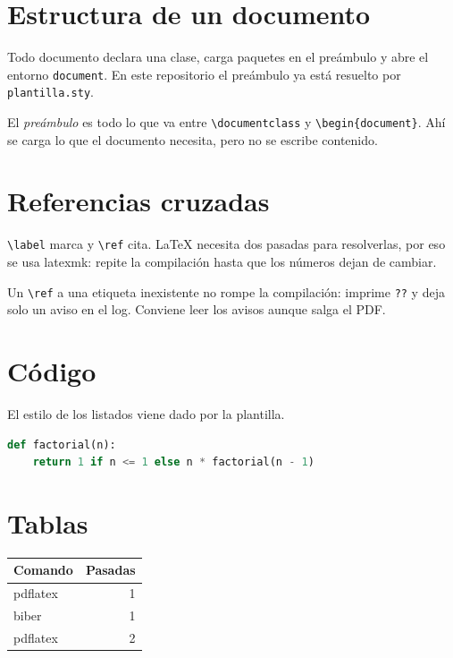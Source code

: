 \documentclass[a4paper,11pt]{article}
\begin{document}
\portada
\indice

\section{Estructura de un documento}

Todo documento declara una clase, carga paquetes en el preámbulo y abre el
entorno \texttt{document}. En este repositorio el preámbulo ya está resuelto por
\texttt{plantilla.sty}.

\begin{nota}[Definición]
    El \emph{preámbulo} es todo lo que va entre
    \texttt{\textbackslash documentclass} y
    \texttt{\textbackslash begin\{document\}}. Ahí se carga lo que el documento
    necesita, pero no se escribe contenido.
\end{nota}

\section{Referencias cruzadas}

\texttt{\textbackslash label} marca y \texttt{\textbackslash ref} cita. LaTeX
necesita dos pasadas para resolverlas, por eso se usa latexmk: repite la
compilación hasta que los números dejan de cambiar.

\begin{aviso}[Cuidado]
    Un \texttt{\textbackslash ref} a una etiqueta inexistente no rompe la
    compilación: imprime \texttt{??} y deja solo un aviso en el log. Conviene
    leer los avisos aunque salga el PDF.
\end{aviso}

\section{Código}

El estilo de los listados viene dado por la plantilla.

\begin{lstlisting}[language=Python,caption={Un ejemplo cualquiera}]
def factorial(n):
    return 1 if n <= 1 else n * factorial(n - 1)
\end{lstlisting}

\section{Tablas}

\begin{center}
    \begin{tabular}{lr}
        \textbf{Comando} & \textbf{Pasadas} \\
        \hline
        pdflatex         & 1                \\
        biber            & 1                \\
        pdflatex         & 2                \\
    \end{tabular}
\end{center}
\end{document}
